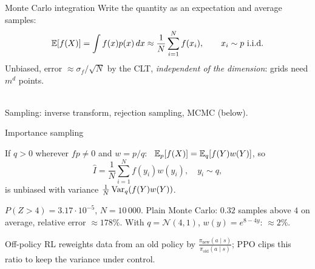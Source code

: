 \documentclass[aspectratio=1610,11pt]{beamer}
\begin{document}

\begin{frame}{Monte Carlo integration}
    \small
    Write the quantity as an expectation and average samples:
    \[\mathbb{E}[f(X)] = \int f(x)p(x)\,dx \approx \frac{1}{N}\sum_{i=1}^Nf(x_i), \qquad x_i \sim p \text{ i.i.d.}\]
    Unbiased, error $\approx \sigma_f/\sqrt{N}$ by the CLT, \emph{independent of the dimension}: grids need $m^d$ points.
    \\[0.3em]
    \centering{}
    \\[0.1em]
    \raggedright Sampling: inverse transform, rejection sampling, MCMC (below).
\end{frame}

\begin{frame}{Importance sampling}
    \begin{proposition}
        \small If $q > 0$ wherever $fp \neq 0$ and $w = p/q$: \ $\mathbb{E}_p[f(X)] = \mathbb{E}_q[f(Y)w(Y)]$, so
        \[\hat I = \frac{1}{N}\sum_{i=1}^Nf(y_i)w(y_i), \quad y_i \sim q,\]
        is unbiased with variance $\frac{1}{N}\operatorname{Var}_q(f(Y)w(Y))$.
    \end{proposition}
    \begin{example}
        \small $P(Z > 4) = 3.17 \cdot 10^{-5}$, $N = 10\,000$. Plain Monte Carlo: $0.32$ samples above $4$ on average, relative error $\approx 178\%$. With $q = \mathcal{N}(4, 1)$, $w(y) = e^{8 - 4y}$: $\approx 2\%$.
    \end{example}
    \begin{mlbox}
        \small Off-policy RL reweights data from an old policy by $\frac{\pi_{\text{new}}(a \mid s)}{\pi_{\text{old}}(a \mid s)}$; PPO clips this ratio to keep the variance under control.
    \end{mlbox}
\end{frame}

\end{document}
